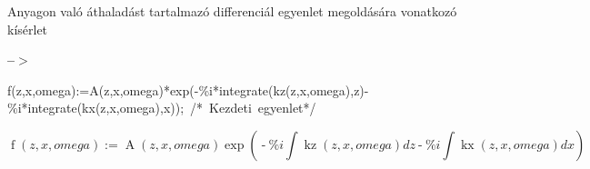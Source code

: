 \documentclass{article}
\begin{document}
Anyagon való áthaladást tartalmazó differenciál egyenlet megoldására vonatkozó kísérlet


\noindent
\begin{minipage}[t]{4.000000em}\color{red}\bfseries
 --\ensuremath{\ensuremath{>}}	
\end{minipage}
\begin{minipage}[t]{\textwidth}\color{blue}
f(z,x,omega):=A(z,x,omega)*exp(-\%i*integrate(kz(z,x,omega),z)-\%i*integrate(kx(z,x,omega),x));\ /*\ Kezdeti\ egyenlet*/
\end{minipage}
\begin{equation}
 \tag{\% o1} 
\operatorname{f}\left( z\operatorname{,}x\operatorname{,}omega\right) \operatorname{:=} \operatorname{A}\left( z\operatorname{,}x\operatorname{,}omega\right)  \operatorname{exp}\left( \operatorname{-}\% i \int {\left. \operatorname{kz}\left( z\operatorname{,}x\operatorname{,}omega\right) dz\right.}\operatorname{-}\% i \int {\left. \operatorname{kx}\left( z\operatorname{,}x\operatorname{,}omega\right) dx\right.}\right) \mbox{}
\end{equation}
\end{document}
